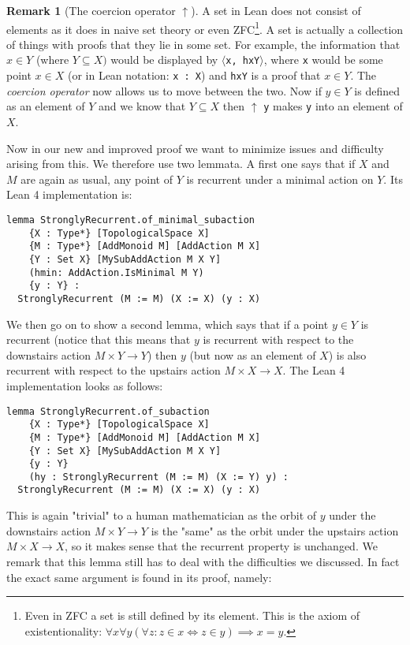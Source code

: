 \documentclass[11pt]{article}
\theoremstyle{definition}              %
\theoremstyle{definition}              %
\theoremstyle{definition}              %
\newtheorem{remark}[theorem]{Remark}
\begin{document}
\begin{remark} [The coercion operator $\uparrow$]
A set in Lean does not consist of elements as it does in naive set theory or even ZFC\footnote{Even in ZFC a set is still defined by its element. This is the axiom of existentionality: $\forall x \forall y (\forall z: z \in x \iff z \in y) \implies x=y$.}. A set is actually a collection of things with proofs that they lie in some set. For example, the information that $x \in Y$ (where $Y \subseteq X)$ would be displayed by $\langle$\verb|x, hxY|$\rangle$, where \verb|x| would be some point $x \in X$ (or in Lean notation: \verb|x : X|) and \verb|hxY| is a proof that $x \in Y$. The \emph{coercion operator} now allows us to move between the two. Now if $y \in Y$ is defined as an element of $Y$ and we know that $Y \subseteq X$ then $\uparrow$ \verb|y| makes \verb|y| into an element of $X$.
\end{remark}

Now in our new and improved proof we want to minimize issues and difficulty arising from this. We therefore use two lemmata. A first one says that if $X$ and $M$ are again as usual, any point of $Y$ is recurrent under a minimal action on $Y$. Its Lean 4 implementation is:

\begin{lstlisting}
lemma StronglyRecurrent.of_minimal_subaction
    {X : Type*} [TopologicalSpace X]
    {M : Type*} [AddMonoid M] [AddAction M X]
    {Y : Set X} [MySubAddAction M X Y]
    (hmin: AddAction.IsMinimal M Y)
    {y : Y} :
  StronglyRecurrent (M := M) (X := X) (y : X)
\end{lstlisting}

We then go on to show a second lemma, which says that if a point $y \in Y$ is recurrent (notice that this means that $y$ is recurrent with respect to the downstairs action $M \times Y \to Y$) then $y$ (but now as an element of $X$) is also recurrent with respect to the upstairs action $M \times X \to X$. The Lean 4 implementation looks as follows:

\pagebreak

\begin{lstlisting}
lemma StronglyRecurrent.of_subaction
    {X : Type*} [TopologicalSpace X]
    {M : Type*} [AddMonoid M] [AddAction M X]
    {Y : Set X} [MySubAddAction M X Y]
    {y : Y}
    (hy : StronglyRecurrent (M := M) (X := Y) y) :
  StronglyRecurrent (M := M) (X := X) (y : X)
\end{lstlisting}

This is again "trivial" to a human mathematician as the orbit of $y$ under the downstairs action $M \times Y \to Y$ is the "same" as the orbit under the upstairs action $M \times X \to X$, so it makes sense that the recurrent property is unchanged. We remark that this lemma still has to deal with the difficulties we discussed. In fact the exact same argument is found in its proof, namely:
\end{document}
